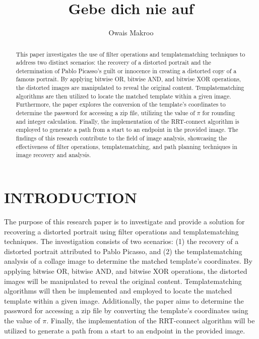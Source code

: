 \documentclass[letterpaper, 10 pt, conference]{IEEEtran}
\title{\LARGE \bf
Gebe dich nie auf
}
\author{Owais Makroo
}
\begin{document}
\maketitle 
\thispagestyle{empty}
\pagestyle{empty}


\begin{abstract}
\textbf{}
This paper investigates the use of filter operations and templatematching 
techniques to address two distinct scenarios: the recovery of a distorted 
portrait and the determination of Pablo Picasso's guilt or innocence in
creating a distorted copy of a famous portrait. By applying bitwise OR,
bitwise AND, and bitwise XOR operations, the distorted images are manipulated
to reveal the original content. Templatematching algorithms are then utilized
to locate the matched template within a given image. Furthermore, the paper
explores the conversion of the template's coordinates to determine the
password for accessing a zip file, utilizing the value of $\pi$ for
rounding and integer calculation. Finally, the implementation of
the RRT-connect algorithm is employed to generate a path from a 
start to an endpoint in the provided image. The findings of this
research contribute to the field of image analysis, showcasing
the effectiveness of filter operations, templatematching, and
path planning techniques in image recovery and analysis.
\end{abstract}




\section{INTRODUCTION}

The purpose of this research paper is to investigate and provide a solution for 
recovering a distorted portrait using filter operations and templatematching
techniques. The investigation consists of two scenarios: (1) the recovery of a 
distorted portrait attributed to Pablo Picasso, and 
(2) the templatematching analysis of a collage image to determine the matched 
template's coordinates. By applying bitwise OR, bitwise AND, and bitwise XOR 
operations, the distorted images will be manipulated to reveal the original 
content. Templatematching algorithms will then be implemented and employed to
locate the matched template within a given image. Additionally, the paper 
aims to determine the password for accessing a zip file by converting the 
template's coordinates using the value of $\pi$. Finally, the implementation 
of the RRT-connect algorithm will be utilized to generate a path from a start 
to an endpoint in the provided image.
\end{document}
